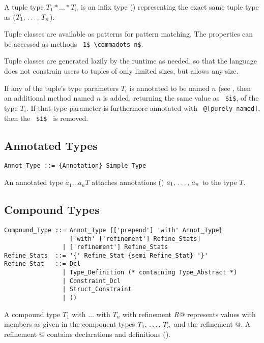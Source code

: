 A tuple type $T_1 * \ldots * T_n$ is an infix type () representing the exact same tuple type as ($T_1 ,\, \ldots ,\, T_n$).

Tuple classes are available as patterns for pattern matching. The properties can be accessed as methods ~\lstinline!1$ \commadots n$!. 

Tuple classes are generated lazily by the runtime as needed, so that the language does not constrain users to tuples of only limited sizes, but allows any size. 

If any of the tuple's type parameters $T_i$ is annotated to be named $n$ (see , then an additional method named $n$ is added, returning the same value as ~\lstinline!$i$!, of the type $T_i$. If that type parameter is furthermore annotated with ~\lstinline!@[purely_named]!, then the ~\lstinline!$i$!~ is removed. 






\subsection{Annotated Types}

\syntax\begin{lstlisting}
Annot_Type ::= {Annotation} Simple_Type
\end{lstlisting}

An annotated type $a_1 \ldots a_n T$ attaches annotations () $a_1 ,\, \ldots ,\, a_n$ to the type $T$. 






\subsection{Compound Types}
\label{sec:compound-types}

\syntax\begin{lstlisting}
Compound_Type ::= Annot_Type {['prepend'] 'with' Annot_Type} 
                  ['with' ['refinement'] Refine_Stats]
                | ['refinement'] Refine_Stats
Refine_Stats  ::= '{' Refine_Stat {semi Refine_Stat} '}'
Refine_Stat   ::= Dcl
                | Type_Definition (* containing Type_Abstract *)
                | Constraint_Dcl
                | Struct_Constraint
                | ()
\end{lstlisting}

A compound type \lstinline@$T_1$ with $\ldots$ with $T_n$ with refinement {$R$}@ represents values with members as given in the component types $T_1 ,\, \ldots ,\, T_n$ and the refinement @. A refinement @ contains declarations and definitions (). 

